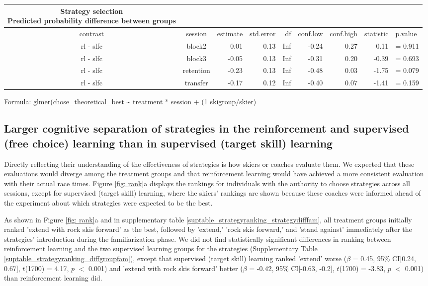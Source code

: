 \documentclass[pdflatex,sn-mathphys-num]{sn-jnl}%
\theoremstyle{thmstyleone}%
\theoremstyle{thmstyletwo}%
\theoremstyle{thmstylethree}%
\begin{document}
 
\setlength{\LTpost}{0mm}
\begin{longtable}{ccrrrrrrl}
\caption*{
{\large Strategy selection} \\ 
{\small Predicted probability difference between groups}
} \\ 
\toprule
contrast & session & estimate & std.error & df & conf.low & conf.high & statistic & p.value \\ 
\midrule\addlinespace[2.5pt]
rl - slfc & block2 & 0.01 & 0.13 & Inf & -0.24 & 0.27 & 0.11 &  =  0.911 \\ 
rl - slfc & block3 & -0.05 & 0.13 & Inf & -0.31 & 0.20 & -0.39 &  =  0.693 \\ 
rl - slfc & retention & -0.23 & 0.13 & Inf & -0.48 & 0.03 & -1.75 &  =  0.079 \\ 
rl - slfc & transfer & -0.17 & 0.12 & Inf & -0.40 & 0.07 & -1.41 &  =  0.159 \\ 
\bottomrule
\end{longtable}
\begin{minipage}{\linewidth}
Formula: glmer(chose\_theoretical\_best \textasciitilde{} treatment * session + (1 \textbar{} skigroup/skier)\\
\end{minipage}



\subsection{Larger cognitive separation of strategies in the reinforcement and supervised (free choice) learning than in supervised (target skill) learning}\label{subsec4}




Directly reflecting their understanding of the effectiveness of strategies is how skiers or coaches evaluate them. We expected that these evaluations would diverge among the treatment groups and that reinforcement learning would have achieved a more consistent evaluation with their actual race times. Figure \ref{fig: rank}a displays the rankings for individuals with the authority  to choose strategies across all sessions, except for supervised (target skill) learning, where the skiers' rankings are shown because these coaches were informed ahead of the experiment about which strategies were expected to be the best. 

As shown in Figure \ref{fig: rank}a and in supplementary table \ref{suptable_strategyranking_strategydifffam}, all treatment groups initially ranked 'extend with rock skis forward' as the best, followed by 'extend,' 'rock skis forward,' and 'stand against' immediately after the strategies' introduction during the familiarization phase. We did not find statistically significant differences in ranking between reinforcement learning and the two supervised learning groups for the strategies (Supplementary Table \ref{suptable_strategyranking_diffgroupfam}), except that supervised (target skill) learning ranked 'extend' worse ($\beta$ = 0.45, 95\% CI[0.24,  0.67], $t$(1700) = 4.17, $p$ $<$ 0.001) and 'extend with rock skis forward' better  ($\beta$ = -0.42, 95\% CI[-0.63, -0.2], $t$(1700) = -3.83, $p$ $<$ 0.001) than reinforcement learning did.
\end{document}
